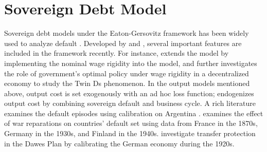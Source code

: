 \section*{Sovereign Debt Model}
Sovereign debt models under the Eaton-Gersovitz framework has been widely used to analyze default \citep*{Eaton-Gersovitz-81}.
Developed by \citet{Aguiar-Gopinath-06} and \citet{Arellano-08},
several important features are included in the framework recently.
For instance,
\citet{Schmitt-Uribe-16} extends the model by implementing the nominal wage rigidity into the model, and \citet{Na-18} further investigates the role of government's optimal policy under wage rigidity in a decentralized economy to study the Twin Ds phenomenon.
In the output models mentioned above, output cost is set exogenously with an ad hoc loss function; \citet*{Mendoza-Yue-12} endogenizes output cost by combining sovereign default and business cycle.
A rich literature examines the default episodes using calibration on Argentina \citep{Arellano-08, Schmitt-Uribe-16,Mendoza-Yue-12,Na-18}. \citet*{Hinrichsen_2020-chapter4} examines the effect of war reparations on countries' default set using data from France in the 1870s, Germany in the 1930s, and Finland in the 1940s. \citet*{Ho-Ritschl-23} investigate transfer protection in the Dawes Plan by calibrating the German economy during the 1920s.